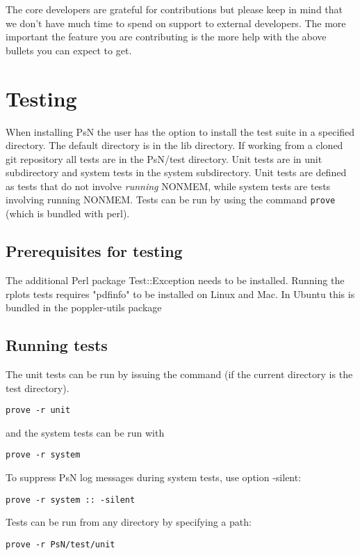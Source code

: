 The core developers are grateful for contributions but please keep in mind that we don't have much time to spend on support to external developers.
The more important the feature you are contributing is the more help with the above bullets you can expect to get.


\section{Testing}
When installing PsN the user has the option to install the test suite in a specified directory. The default directory is in the lib directory. If working from a cloned git repository all tests are in the PsN/test directory. Unit tests are in unit subdirectory and system tests in the system subdirectory.  
Unit tests are defined as tests that do not involve \emph{running} NONMEM, while system tests are tests involving running NONMEM.
Tests can be run by using the command \verb|prove| (which is bundled with perl). 

\subsection{Prerequisites for testing}
The additional Perl package Test::Exception needs to be installed.
Running the rplots tests requires "pdfinfo" to be installed on Linux and Mac. In Ubuntu this is bundled in the poppler-utils package

\subsection{Running tests}
The unit tests can be run by issuing the command (if the current directory is the test directory).
\begin{verbatim}
prove -r unit
\end{verbatim}

and the system tests can be run with
\begin{verbatim}
prove -r system
\end{verbatim}

To suppress PsN log messages during system tests, use option -silent:
\begin{verbatim}
prove -r system :: -silent
\end{verbatim}

Tests can be run from any directory by specifying a path:
\begin{verbatim}
prove -r PsN/test/unit
\end{verbatim}

